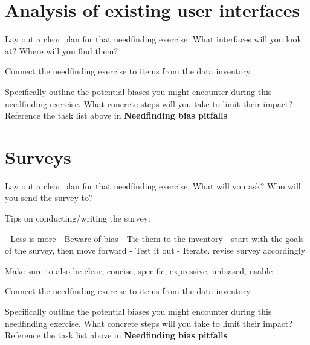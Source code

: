 \section{Analysis of existing user interfaces}
Lay out a clear plan for that needfinding exercise. What interfaces will you look at? Where will you find them?

Connect the needfinding exercise to items from the data inventory

Specifically outline the potential biases you might encounter during this needfinding exercise. What concrete steps will you take to limit their impact? Reference the task list above in \textbf{Needfinding bias pitfalls}

\section{Surveys}
Lay out a clear plan for that needfinding exercise. What will you ask? Who will you send the survey to?

Tips on conducting/writing the survey:

- Less is more
- Beware of bias
- Tie them to the inventory
  - start with the goals of the survey, then move forward
- Test it out
- Iterate. revise survey accordingly

Make sure to also be clear, concise, specific, expressive, unbiased, usable

Connect the needfinding exercise to items from the data inventory

Specifically outline the potential biases you might encounter during this needfinding exercise. What concrete steps will you take to limit their impact? Reference the task list above in \textbf{Needfinding bias pitfalls}


